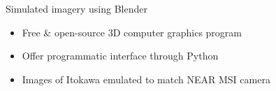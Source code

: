 \documentclass[11pt,professionalfonts]{beamer}
\begin{document}
\begin{frame}{Simulated imagery using Blender}
    \begin{itemize}
        \item Free \& open-source 3D computer graphics program
        \item Offer programmatic interface through Python
        \item Images of Itokawa emulated to match NEAR MSI camera
    \end{itemize}
    \begin{center}
    ~
\end{center}
\end{frame}
\end{document}
